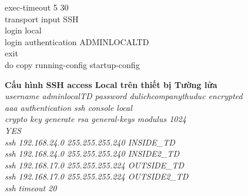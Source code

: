 \documentclass[a4paper, 12pt]{article}
\begin{document}
{\hspace*{2cm}exec-timeout 5 30\\
\hspace*{2cm}transport input SSH \\
\hspace*{2cm}login local\\
\hspace*{2cm}login authentication ADMINLOCALTD\\
\hspace*{2cm}exit\\
\hspace*{2cm}do copy running-config startup-config\\}

\hspace*{1cm}\textbf{Cấu hình SSH access Local trên thiết bị Tường lửa}\\
\hspace*{2cm}\textit{username adminlocalTD password dulichcompanythuduc encrypted\\
\hspace*{2cm}aaa authentication ssh console local \\
\hspace*{2cm}crypto key generate rsa general-keys modulus 1024\\
\hspace*{2cm}YES\\
\hspace*{2cm}ssh 192.168.24.0 255.255.255.240 INSIDE\_TD\\
\hspace*{2cm}ssh 192.168.24.0 255.255.255.240 INSIDE2\_TD\\
\hspace*{2cm}ssh 192.168.17.0 255.255.255.224 OUTSIDE\_TD\\
\hspace*{2cm}ssh 192.168.17.0 255.255.255.224 OUTSIDE2\_TD\\
\hspace*{2cm}ssh timeout 20\\}
\end{document}
